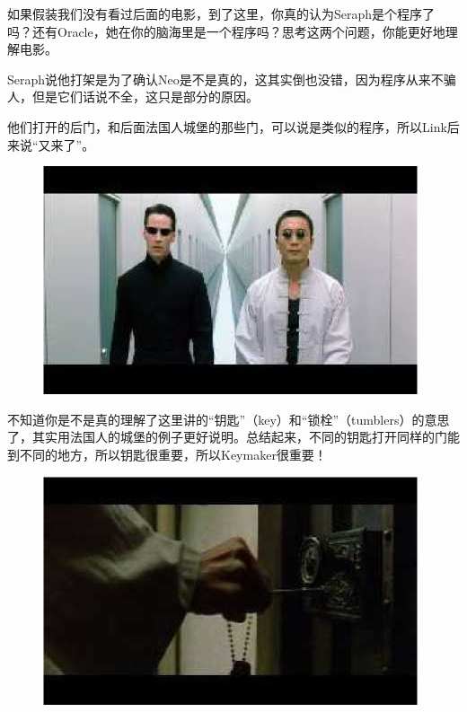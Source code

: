\documentclass{ctexart}
\begin{document}
如果假装我们没有看过后面的电影，到了这里，你真的认为Seraph是个程序了吗？还有Oracle，她在你的脑海里是一个程序吗？思考这两个问题，你能更好地理解电影。

Seraph说他打架是为了确认Neo是不是真的，这其实倒也没错，因为程序从来不骗人，但是它们话说不全，这只是部分的原因。

他们打开的后门，和后面法国人城堡的那些门，可以说是类似的程序，所以Link后来说“又来了”。

\begin{figure}[htb]
\centering
\includegraphics[width=0.5\linewidth]{fig/read_reloaded-61}
\end{figure}

不知道你是不是真的理解了这里讲的“钥匙”（key）和“锁栓”（tumblers）的意思了，其实用法国人的城堡的例子更好说明。总结起来，不同的钥匙打开同样的门能到不同的地方，所以钥匙很重要，所以Keymaker很重要！

\begin{figure}[htb]
\centering
\includegraphics[width=0.5\linewidth]{fig/read_reloaded-62}
\end{figure}
\end{document}
